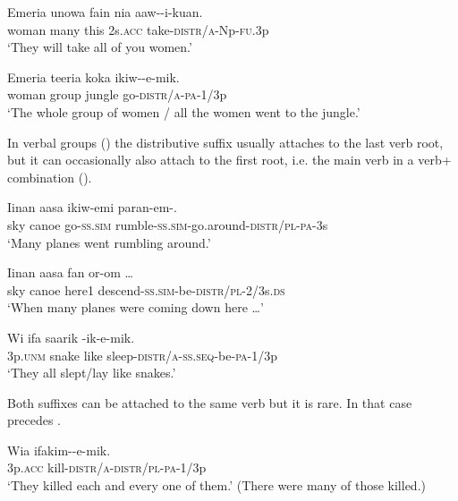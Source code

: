 \ea%
\label{ex:x492}
\gll Emeria unowa fain nia aaw--i-kuan. \\
woman many this 2s.\textsc{acc} take-\textsc{distr}/\textsc{a}-Np-\textsc{fu}.3p\\
\glt`They will take all of you women.'
\z

\ea%
\label{ex:x491}
\gll Emeria teeria koka ikiw--e-mik. \\
woman group jungle go-\textsc{distr}/\textsc{a}-\textsc{pa}-1/3p\\
\glt`The whole group of women / all the women went to the jungle.'
\z

In verbal groups () the distributive suffix usually attaches to the last verb root, but it can occasionally also attach to the first root, i.e. the main verb in a verb+ combination ().

\ea%
\label{ex:x207}
\gll Iinan aasa ikiw-emi paran-em-. \\
sky canoe go-\textsc{ss}.\textsc{sim} rumble-\textsc{ss}.\textsc{sim}-go.around-\textsc{distr}/\textsc{pl}-\textsc{pa}-3s\\
\glt `Many planes went rumbling around.'
\z

\ea%
\label{ex:x490}
\gll Iinan aasa fan or-om {\dots} \\
sky canoe here1 descend-\textsc{ss}.\textsc{sim}-be-\textsc{distr}/\textsc{pl}-2/3s.\textsc{ds}\\
\glt`When many planes were coming down here {\dots}'
\z

\ea%
\label{ex:x208}
\gll Wi ifa saarik -ik-e-mik. \\
3p.\textsc{unm} snake like sleep-\textsc{distr}/\textsc{a}-\textsc{ss}.\textsc{seq}-be-\textsc{pa}-1/3p \\
\glt`They all slept/lay like snakes.'
\z

Both suffixes can be attached to the same verb but it is rare. In that case \textstyleEmphasizedVernacularWords{\nobreakdash-} precedes \textstyleEmphasizedVernacularWords{\nobreakdash-}.

\ea%
\label{ex:x206}
\gll Wia ifakim--e-mik. \\
3p.\textsc{acc} kill-\textsc{distr}/\textsc{a}-\textsc{distr}/\textsc{pl}-\textsc{pa}-1/3p \\
\glt`They killed each and every one of them.' (There were many of those killed.) 
\z

